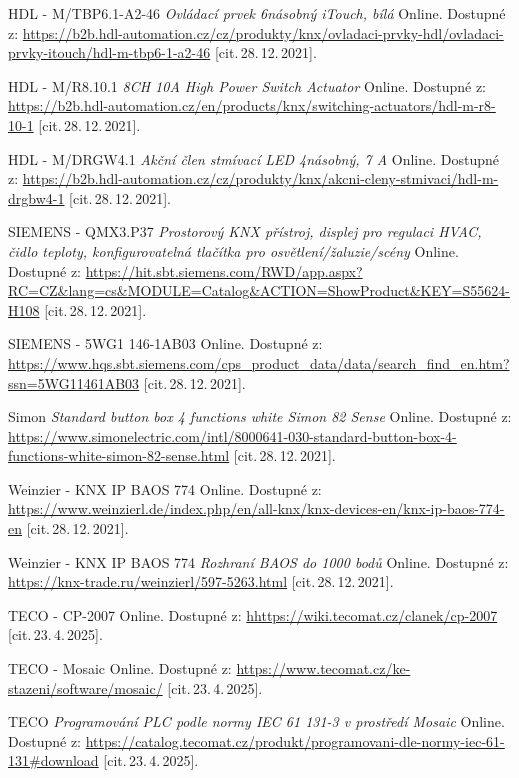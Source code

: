 \begin{thebibliography}{99}
        HDL - M/TBP6.1-A2-46 \textit{Ovládací prvek 6násobný iTouch, bílá}\/ Online. 
		Dostupné z:
    \url{https://b2b.hdl-automation.cz/cz/produkty/knx/ovladaci-prvky-hdl/ovladaci-prvky-itouch/hdl-m-tbp6-1-a2-46}
		[cit.\,28.\,12.\,2021].
    
        HDL - M/R8.10.1 \textit{8CH 10A High Power Switch Actuator}\/ Online. 
		Dostupné z:
    \url{https://b2b.hdl-automation.cz/en/products/knx/switching-actuators/hdl-m-r8-10-1}
		[cit.\,28.\,12.\,2021].
    
        HDL - M/DRGW4.1 \textit{Akční člen stmívací LED 4násobný, 7 A}\/ Online. 
		Dostupné z:
    \url{https://b2b.hdl-automation.cz/cz/produkty/knx/akcni-cleny-stmivaci/hdl-m-drgbw4-1}
		[cit.\,28.\,12.\,2021].
    
		SIEMENS - QMX3.P37 \textit{Prostorový KNX přístroj, displej pro regulaci HVAC, čidlo teploty, konfigurovatelná tlačítka pro osvětlení/žaluzie/scény}\/ Online. 
		Dostupné z:
    \url{https://hit.sbt.siemens.com/RWD/app.aspx?RC=CZ&lang=cs&MODULE=Catalog&ACTION=ShowProduct&KEY=S55624-H108}
		[cit.\,28.\,12.\,2021].
    
		SIEMENS - 5WG1 146-1AB03 \/ Online. 
		Dostupné z:
    \url{https://www.hqs.sbt.siemens.com/cps_product_data/data/search_find_en.htm?ssn=5WG11461AB03}
		[cit.\,28.\,12.\,2021].  
    
		Simon \emph{Standard button box 4 functions white Simon 82 Sense}\/ Online. 
		Dostupné z:
    \url{https://www.simonelectric.com/intl/8000641-030-standard-button-box-4-functions-white-simon-82-sense.html}
		[cit.\,28.\,12.\,2021].

		Weinzier - KNX IP BAOS 774\/ Online. 
		Dostupné z:
    \url{https://www.weinzierl.de/index.php/en/all-knx/knx-devices-en/knx-ip-baos-774-en}
		[cit.\,28.\,12.\,2021].
    
		Weinzier - KNX IP BAOS 774 \emph{Rozhraní BAOS do 1000 bodů}\/ Online. 
		Dostupné z:
    \url{https://knx-trade.ru/weinzierl/597-5263.html}
		[cit.\,28.\,12.\,2021].

		TECO - CP-2007\/ Online. 
		Dostupné z:
	\url{hhttps://wiki.tecomat.cz/clanek/cp-2007}
		[cit.\,23.\,4.\,2025].

		TECO - Mosaic\/ Online. 
		Dostupné z:
	\url{https://www.tecomat.cz/ke-stazeni/software/mosaic/}
		[cit.\,23.\,4.\,2025].

		TECO \emph{Programování PLC podle normy IEC 61 131-3 v prostředí Mosaic}\/ Online. 
		Dostupné z:
	\url{https://catalog.tecomat.cz/produkt/programovani-dle-normy-iec-61-131#download}
		[cit.\,23.\,4.\,2025].


\end{thebibliography}
